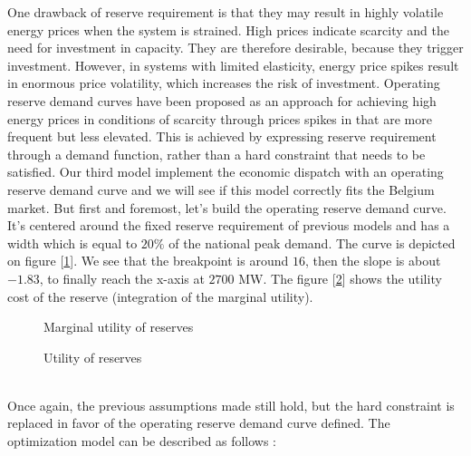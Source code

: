 
One drawback of reserve requirement is that they may result in highly volatile energy prices when the system is strained. High prices indicate scarcity and the need for investment in capacity. They are therefore desirable, because they trigger investment. However, in systems with limited elasticity, energy price spikes result in enormous price volatility, which increases the risk of investment. Operating reserve demand curves have been proposed as an approach for achieving high energy prices in conditions of scarcity through prices spikes in that are more frequent but less elevated. This is achieved by expressing reserve requirement through a demand function, rather than a hard constraint that needs to be satisfied. Our third model implement the economic dispatch with an operating reserve demand curve and we will see if this model correctly fits the Belgium market.
But first and foremost, let's build the operating reserve demand curve. It's centered around the fixed reserve requirement of previous models and has a width which is equal to $20 \%$ of the national peak demand. The curve is depicted on figure [\ref{fig:ReserveCurve}]. We see that the breakpoint is around $16$, then the slope is about $-1.83$, to finally reach the x-axis at $2700$ MW. The figure [\ref{fig:ReserveUtility}] shows the utility cost of the reserve (integration of the marginal utility).

\begin{minipage}{0.495\textwidth} 
\begin{figure}[H]
    \centering
    \setlength\fheight{3cm}
    \setlength{}
    
    \caption{Marginal utility of reserves}
    \label{fig:ReserveCurve}
\end{figure}
\end{minipage}
\begin{minipage}{0.495\textwidth} 
\begin{figure}[H]
    \centering
    \setlength\fheight{3cm}
    \setlength{}
    
    \caption{Utility of reserves}
    \label{fig:ReserveUtility}
\end{figure}
\end{minipage}\\


Once again, the previous assumptions made still hold, but the hard constraint is replaced in favor of the operating reserve demand curve defined. The optimization model can be described as follows : \\

